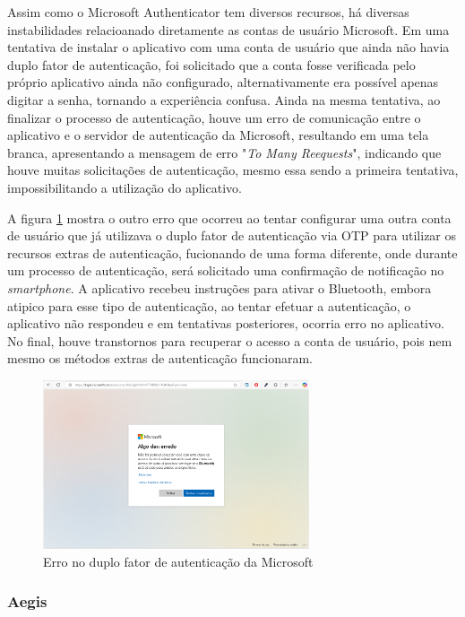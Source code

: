 \documentclass[12pt]{article}
\begin{document}
Assim como o Microsoft Authenticator tem diversos recursos, há diversas instabilidades
relacioanado diretamente as contas de usuário Microsoft.
Em uma tentativa de instalar o aplicativo com uma conta de usuário que ainda não havia
duplo fator de autenticação, foi solicitado que a conta fosse verificada pelo próprio
aplicativo ainda não configurado, alternativamente era possível apenas digitar a senha,
tornando a experiência confusa.
Ainda na mesma tentativa, ao finalizar o processo de autenticação, houve um erro de
comunicação entre o aplicativo e o servidor de autenticação da Microsoft, resultando
em uma tela branca, apresentando a mensagem de erro "\textit{To Many Reequests}",
indicando que houve muitas solicitações de autenticação, mesmo essa sendo a primeira
tentativa, impossibilitando a utilização do aplicativo.

A figura \ref{fig:Microsoft2FactoryAutenticatorError} mostra o outro erro que
ocorreu ao tentar configurar uma outra conta de usuário que já utilizava o duplo fator de
autenticação via OTP para utilizar os recursos extras de autenticação, fucionando de uma forma
diferente, onde durante um processo de autenticação, será solicitado uma confirmação de
notificação no \textit{smartphone}.
A aplicativo recebeu instruções para ativar o Bluetooth, embora atipico para esse tipo
de autenticação, ao tentar efetuar a autenticação, o aplicativo não respondeu e em tentativas
posteriores, ocorria erro no aplicativo.
No final, houve transtornos para recuperar o acesso a conta de usuário, pois nem mesmo os
métodos extras de autenticação funcionaram.

\begin{figure}[h!]
  \centering
  \includegraphics[width=0.7\textwidth]{./assets/microsoft_error_2.png}
  \caption{Erro no duplo fator de autenticação da Microsoft}
  \label{fig:Microsoft2FactoryAutenticatorError}
\end{figure}

\subsubsection{Aegis}
\end{document}
